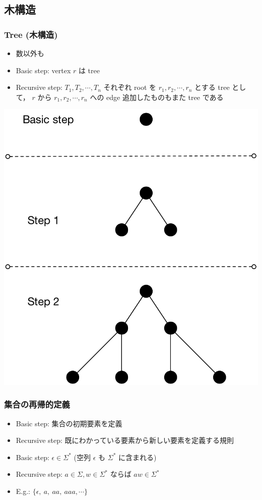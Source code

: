 \subsection{木構造}
\begin{frame}[fragile]
\frametitle{Tree (木構造)}
  \begin{itemize}
\item 数以外も
\item Basic step: vertex $r$ は tree
\item Recursive step: \(T_1,T_2,\cdots,T_n\) それぞれ root を \(r_1,r_2,\cdots,r_n\) とする tree として，
\(r\) から \(r_1,r_2,\cdots,r_n\) への edge 追加したものもまた tree である
  \end{itemize}
  \begin{center}
\includegraphics[scale=0.3]{./Figure/elementaryCS-tree.pdf}
  \end{center}
\end{frame}
\begin{frame}[fragile]
\frametitle{集合の再帰的定義}
  \begin{itemize}
\item Basic step: 集合の初期要素を定義
\item Recursive step: 既にわかっている要素から新しい要素を定義する規則
  \end{itemize}
  \begin{example}
    \begin{itemize}
\item Basic step: \(\epsilon\in\Sigma^*\) (空列 \(\epsilon\) も \(\Sigma^*\) に含まれる)
\item Recursive step: \(a\in\Sigma,w\in\Sigma^*\) ならば \(aw\in\Sigma^*\)
\item E.g.: \(\{\epsilon,\ a,\ aa,\ aaa,\cdots\}\)
    \end{itemize}
  \end{example}
\end{frame}
